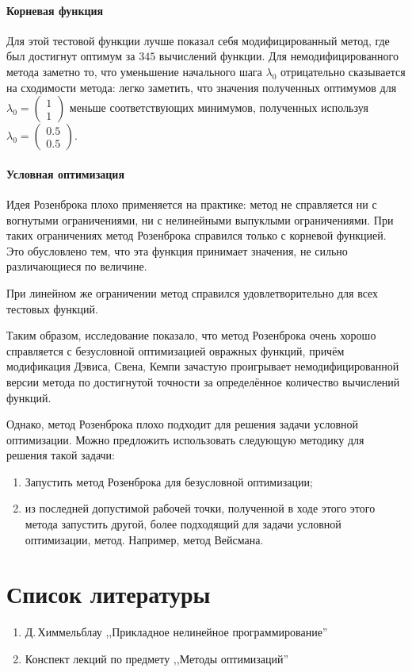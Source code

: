 \documentclass[a4paper,12pt,notitlepage,pdftex,headsepline]{scrartcl}
\begin{document}
  \paragraph{Корневая функция}
    Для этой тестовой функции лучше показал себя модифицированный метод, где
    был достигнут оптимум за $345$ вычислений функции.
    Для немодифицированного метода заметно то, что уменьшение начального шага
    $\lambda_0$ отрицательно сказывается на сходимости метода: легко заметить,
    что значения полученных оптимумов для $\lambda_0 = \left(\begin{matrix} 1\\
      1\end{matrix}\right)$ меньше соответствующих минимумов, полученных
      используя $\lambda_0 = \left(\begin{matrix} 0.5\\
        0.5\end{matrix}\right)$.

  \paragraph{Условная оптимизация}
    Идея Розенброка плохо применяется на практике:
    метод не справляется ни с вогнутыми ограничениями, ни с нелинейными
    выпуклыми ограничениями.
    При таких ограничениях метод Розенброка справился только с корневой
    функцией.
    Это обусловлено тем, что эта функция принимает значения, не сильно
    различающиеся по величине.

    При линейном же ограничении метод справился удовлетворительно для всех
    тестовых функций.

  Таким образом, исследование показало, что метод Розенброка очень хорошо
  справляется с безусловной оптимизацией овражных функций, причём модификация
  Дэвиса, Свена, Кемпи зачастую проигрывает немодифицированной версии метода
  по достигнутой точности за определённое количество вычислений функций.

  Однако, метод Розенброка плохо подходит для решения задачи условной
  оптимизации.
  Можно предложить использовать следующую методику для решения такой задачи:
  \begin{enumerate}
    \item Запустить метод Розенброка для безусловной оптимизации;
    \item из последней допустимой рабочей точки, полученной в ходе этого этого
      метода запустить другой, более подходящий для задачи условной
      оптимизации, метод.
      Например, метод Вейсмана.
  \end{enumerate}
  \clearpage
\section{Список литературы}
\begin{enumerate}
  \item Д.\,Химмельблау ,,Прикладное нелинейное программирование''
  \item Конспект лекций по предмету ,,Методы оптимизаций''
\end{enumerate}
\end{document}
